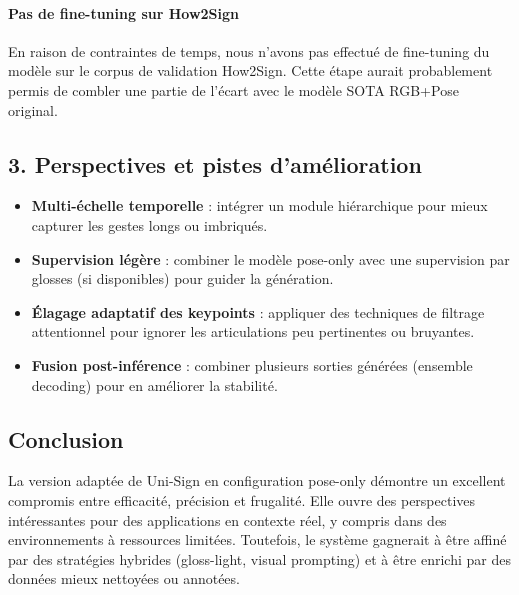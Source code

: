 \paragraph{Pas de fine-tuning sur How2Sign}

En raison de contraintes de temps, nous n’avons pas effectué de fine-tuning du modèle sur le corpus de validation How2Sign. Cette étape aurait probablement permis de combler une partie de l’écart avec le modèle SOTA RGB+Pose original.

\subsection*{3. Perspectives et pistes d’amélioration}

\begin{itemize}
    \item \textbf{Multi-échelle temporelle} : intégrer un module hiérarchique pour mieux capturer les gestes longs ou imbriqués.
    \item \textbf{Supervision légère} : combiner le modèle pose-only avec une supervision par glosses (si disponibles) pour guider la génération.
    \item \textbf{Élagage adaptatif des keypoints} : appliquer des techniques de filtrage attentionnel pour ignorer les articulations peu pertinentes ou bruyantes.
    \item \textbf{Fusion post-inférence} : combiner plusieurs sorties générées (ensemble decoding) pour en améliorer la stabilité.
\end{itemize}

\subsection*{Conclusion}

La version adaptée de Uni-Sign en configuration pose-only démontre un excellent compromis entre efficacité, précision et frugalité. Elle ouvre des perspectives intéressantes pour des applications en contexte réel, y compris dans des environnements à ressources limitées. Toutefois, le système gagnerait à être affiné par des stratégies hybrides (gloss-light, visual prompting) et à être enrichi par des données mieux nettoyées ou annotées.
